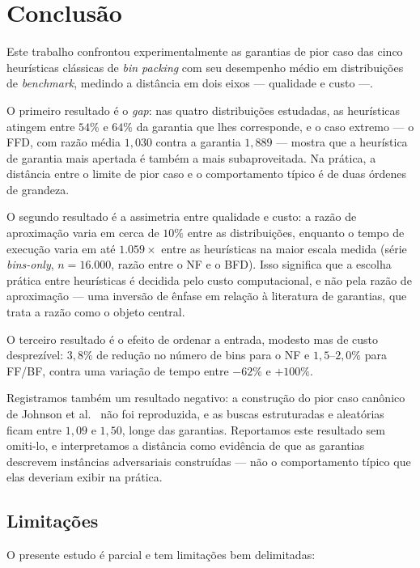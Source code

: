 \documentclass[12pt]{article}
\begin{document}
\section{Conclusão} \label{sec:conclusao}

Este trabalho confrontou experimentalmente as garantias de pior caso das cinco heurísticas clássicas de \textit{bin packing} com seu desempenho médio em distribuições de \emph{benchmark}, medindo a distância em dois eixos --- qualidade e custo ---.

O primeiro resultado é o \emph{gap}: nas quatro distribuições estudadas, as heurísticas atingem entre $54\%$ e $64\%$ da garantia que lhes corresponde, e o caso extremo --- o FFD, com razão média $1{,}030$ contra a garantia $1{,}889$ --- mostra que a heurística de garantia mais apertada é também a mais subaproveitada. Na prática, a distância entre o limite de pior caso e o comportamento típico é de duas órdenes de grandeza.

O segundo resultado é a assimetria entre qualidade e custo: a razão de aproximação varia em cerca de $10\%$ entre as distribuições, enquanto o tempo de execução varia em até $1.059\times$ entre as heurísticas na maior escala medida (série \textit{bins-only}, $n = 16.000$, razão entre o NF e o BFD). Isso significa que a escolha prática entre heurísticas é decidida pelo custo computacional, e não pela razão de aproximação --- uma inversão de ênfase em relação à literatura de garantias, que trata a razão como o objeto central.

O terceiro resultado é o efeito de ordenar a entrada, modesto mas de custo desprezível: $3{,}8\%$ de redução no número de bins para o NF e $1{,}5$--$2{,}0\%$ para FF/BF, contra uma variação de tempo entre $-62\%$ e $+100\%$.

Registramos também um resultado negativo: a construção do pior caso canônico de Johnson et al.~\cite{johnson1974} não foi reproduzida, e as buscas estruturadas e aleatórias ficam entre $1{,}09$ e $1{,}50$, longe das garantias. Reportamos este resultado sem omiti-lo, e interpretamos a distância como evidência de que as garantias descrevem instâncias adversariais construídas --- não o comportamento típico que elas deveriam exibir na prática.

\subsection*{Limitações}

O presente estudo é parcial e tem limitações bem delimitadas:
\end{document}
